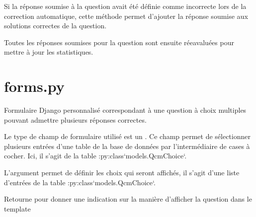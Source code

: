 \documentclass[a4,10pt,french]{sphinxmanual}
\begin{document}
\begin{fulllineitems}
\begin{fulllineitems}
\end{fulllineitems}


\begin{fulllineitems}
\label{source:quiz.models.SqSubmit.set_as_correct}
Si la réponse soumise à la question avait été définie comme incorrecte
lors de la correction automatique, cette méthode permet d'ajouter la réponse
soumise aux solutions correctes de la question.

Toutes les réponses soumises pour la question sont ensuite réeavaluées pour
mettre à jour les statistiques.

\end{fulllineitems}


\end{fulllineitems}



\section{forms.py}
\label{source:forms-py}\label{source:module-quiz.forms}

\begin{fulllineitems}
\label{source:quiz.forms.CheckboxForm}
Formulaire Django personnalisé correspondant à une question à choix multiples
pouvant admettre plusieurs réponses correctes.

Le type de champ de formulaire utilisé est un . Ce champ permet
de sélectionner plusieurs entrées d'une table de la base de données par l'intermédiaire
de cases à cocher. Ici, il s'agit
de la table :py:class{}`models.QcmChoice{}`.

L'argument  permet de définir les choix qui seront affichés, il s'agit
d'une liste d'entrées de la table :py:class{}`models.QcmChoice{}`.

\begin{fulllineitems}
\label{source:quiz.forms.CheckboxForm.get_type}
Retourne  pour donner une indication sur la manière d'afficher 
la question dans le template

\end{fulllineitems}


\end{fulllineitems}
\end{document}
